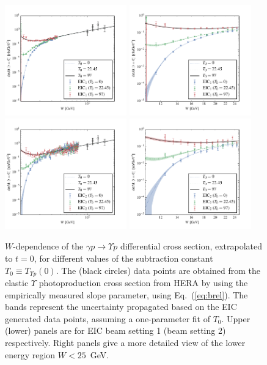 \documentclass[prd,amsmath,%
twocolumn,floatfix,amssymb, preprintnumbers, nofootinbib, superscriptaddress]{revtex4}
\begin{document}
\begin{figure}
\includegraphics[width=0.47\textwidth]{dsdt_y_eic1.pdf}
\includegraphics[width=0.47\textwidth]{dsdt_y_close_eic1.pdf} \\
\includegraphics[width=0.47\textwidth]{dsdt_y_eic2.pdf}
\includegraphics[width=0.47\textwidth]{dsdt_y_close_eic2.pdf}
\caption{$W$-dependence of the $\gamma p \to \Upsilon p$ differential cross section, extrapolated to $t=0$, 
for different values of the subtraction constant $T_0 \equiv T_{\Upsilon p} (0)$. The (black circles) data points are obtained from the elastic $\Upsilon$ photoproduction cross section from HERA by using the empirically measured slope parameter, using Eq.~(\ref{eq:brel}). The bands represent the uncertainty propagated based on the EIC generated data points, assuming a one-parameter fit of $T_0$. Upper (lower) panels are for EIC beam setting 1 (beam setting 2) respectively. Right panels give a more detailed view of the lower energy region $W < 25$~GeV.}
\label{fig:dsigmadt0}
\end{figure}
\end{document}
